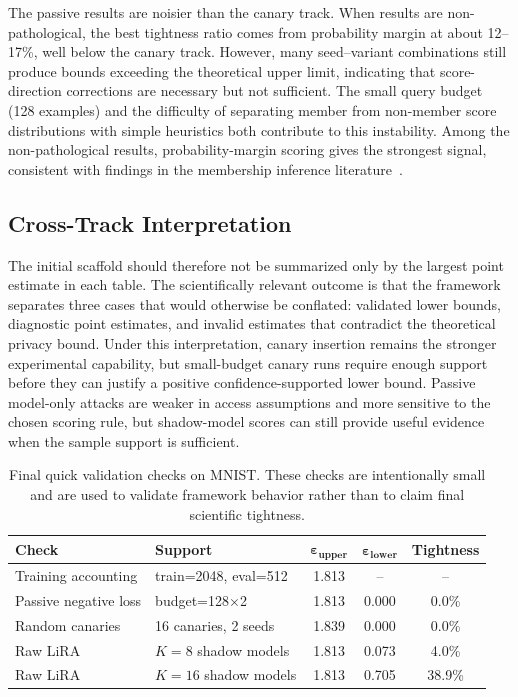 \documentclass{article}
\begin{document}
The passive results are noisier than the canary track. When results are non-pathological, the best tightness ratio comes from probability margin at about 12--17\%, well below the canary track. However, many seed--variant combinations still produce bounds exceeding the theoretical upper limit, indicating that score-direction corrections are necessary but not sufficient. The small query budget (128 examples) and the difficulty of separating member from non-member score distributions with simple heuristics both contribute to this instability. Among the non-pathological results, probability-margin scoring gives the strongest signal, consistent with findings in the membership inference literature~\citep{carlini2022membership}.

\subsection{Cross-Track Interpretation}

The initial scaffold should therefore not be summarized only by the largest point estimate in each table. The scientifically relevant outcome is that the framework separates three cases that would otherwise be conflated: validated lower bounds, diagnostic point estimates, and invalid estimates that contradict the theoretical privacy bound. Under this interpretation, canary insertion remains the stronger experimental capability, but small-budget canary runs require enough support before they can justify a positive confidence-supported lower bound. Passive model-only attacks are weaker in access assumptions and more sensitive to the chosen scoring rule, but shadow-model scores can still provide useful evidence when the sample support is sufficient.

\begin{table}[h]
\caption{Final quick validation checks on MNIST. These checks are intentionally small and are used to validate framework behavior rather than to claim final scientific tightness.}
\label{tab:final_quick_checks}
\centering
\begin{tabular}{@{}llccc@{}}
\toprule
\textbf{Check} & \textbf{Support} & $\boldsymbol{\varepsilon_{\text{upper}}}$ & $\boldsymbol{\varepsilon_{\text{lower}}}$ & \textbf{Tightness} \\
\midrule
Training accounting & train=2048, eval=512 & 1.813 & -- & -- \\
Passive negative loss & budget=128$\times$2 & 1.813 & 0.000 & 0.0\% \\
Random canaries & 16 canaries, 2 seeds & 1.839 & 0.000 & 0.0\% \\
Raw LiRA & $K=8$ shadow models & 1.813 & 0.073 & 4.0\% \\
Raw LiRA & $K=16$ shadow models & 1.813 & 0.705 & 38.9\% \\
\bottomrule
\end{tabular}
\end{table}
\end{document}
